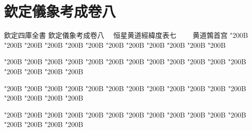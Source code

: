 \chapter*{欽定儀象考成卷八}
\begin{正文}
欽定四庫全書
欽定儀象考成卷八
　恒星黄道經緯度表七
　　黄道鶉首宫
\char"200B\relax{}
\char"200B\relax{}
\char"200B\relax{}
\char"200B\relax{}
\char"200B\relax{}
\char"200B\relax{}
\char"200B\relax{}
\char"200B\relax{}
\char"200B\relax{}
\char"200B\relax{}
\char"200B\relax{}
\char"200B\relax
\par
\end{正文}\clearpage
{}
\begin{正文}
\char"200B\relax{}
\char"200B\relax{}
\char"200B\relax{}
\char"200B\relax{}
\char"200B\relax{}
\char"200B\relax{}
\char"200B\relax{}
\char"200B\relax{}
\char"200B\relax{}
\char"200B\relax{}
\char"200B\relax{}
\char"200B\relax{}
\char"200B\relax{}
\char"200B\relax{}
\char"200B\relax{}
\char"200B\relax
{}\par
\end{正文}\clearpage
{}
\begin{正文}
\char"200B\relax{}
\char"200B\relax{}
\char"200B\relax{}
\char"200B\relax{}
\char"200B\relax{}
\char"200B\relax{}
\char"200B\relax{}
\char"200B\relax{}
\char"200B\relax{}
\char"200B\relax{}
\char"200B\relax{}
\char"200B\relax{}
\char"200B\relax{}
\char"200B\relax{}
\char"200B\relax{}
\char"200B\relax
{}\par
\end{正文}\clearpage
{}
\begin{正文}
\char"200B\relax{}
\char"200B\relax{}
\char"200B\relax{}
\char"200B\relax{}
\char"200B\relax{}
\char"200B\relax{}
\char"200B\relax{}
\char"200B\relax{}
\char"200B\relax{}
\char"200B\relax{}
\char"200B\relax{}
\char"200B\relax{}
\char"200B\relax{}
\char"200B\relax{}
\char"200B\relax{}
\char"200B\relax
{}\par
\end{正文}\clearpage
